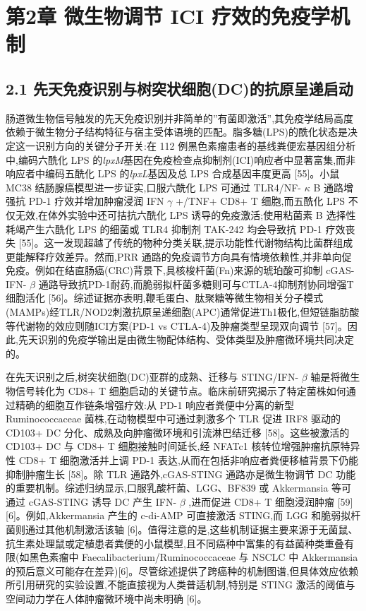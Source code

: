\documentclass[11pt]{article}
\begin{document}
\section{第2章 微生物调节 ICI 疗效的免疫学机制}\label{ux7b2c2ux7ae0-ux5faeux751fux7269ux8c03ux8282-ici-ux7597ux6548ux7684ux514dux75abux5b66ux673aux5236}

\subsection{2.1 先天免疫识别与树突状细胞(DC)的抗原呈递启动}\label{ux5148ux5929ux514dux75abux8bc6ux522bux4e0eux6811ux7a81ux72b6ux7ec6ux80dedcux7684ux6297ux539fux5448ux9012ux542fux52a8}

肠道微生物信号触发的先天免疫识别并非简单的''有菌即激活'',其免疫学结局高度依赖于微生物分子结构特征与宿主受体语境的匹配。脂多糖(LPS)的酰化状态是决定这一识别方向的关键分子开关:在 112 例黑色素瘤患者的基线粪便宏基因组分析中,编码六酰化 LPS 的\emph{lpxM}基因在免疫检查点抑制剂(ICI)响应者中显著富集,而非响应者中编码五酰化 LPS 的\emph{lpxL}基因及总 LPS 合成基因丰度更高 {[}55{]}。小鼠 MC38 结肠腺癌模型进一步证实,口服六酰化 LPS 可通过 TLR4/NF- \(\kappa\) B 通路增强抗 PD-1 疗效并增加肿瘤浸润 IFN \(\gamma\) +/TNF+ CD8+ T 细胞,而五酰化 LPS 不仅无效,在体外实验中还可拮抗六酰化 LPS 诱导的免疫激活;使用粘菌素 B 选择性耗竭产生六酰化 LPS 的细菌或 TLR4 抑制剂 TAK-242 均会导致抗 PD-1 疗效丧失 {[}55{]}。这一发现超越了传统的物种分类关联,提示功能性代谢物结构比菌群组成更能解释疗效差异。然而,PRR 通路的免疫调节方向具有情境依赖性,并非单向促免疫。例如在结直肠癌(CRC)背景下,具核梭杆菌(Fn)来源的琥珀酸可抑制 cGAS-IFN- \(\beta\) 通路导致抗PD-1耐药,而脆弱拟杆菌多糖则可与CTLA-4抑制剂协同增强T细胞活化 {[}56{]}。综述证据亦表明,鞭毛蛋白、肽聚糖等微生物相关分子模式(MAMPs)经TLR/NOD2刺激抗原呈递细胞(APC)通常促进Th1极化,但短链脂肪酸等代谢物的效应则随ICI方案(PD-1 vs CTLA-4)及肿瘤类型呈现双向调节 {[}57{]}。因此,先天识别的免疫学输出是由微生物配体结构、受体类型及肿瘤微环境共同决定的。

在先天识别之后,树突状细胞(DC)亚群的成熟、迁移与 STING/IFN- \(\beta\) 轴是将微生物信号转化为 CD8+ T 细胞启动的关键节点。临床前研究揭示了特定菌株如何通过精确的细胞互作链条增强疗效:从 PD-1 响应者粪便中分离的新型 Ruminococcaceae 菌株,在动物模型中可通过刺激多个 TLR 促进 IRF8 驱动的 CD103+ DC 分化、成熟及向肿瘤微环境和引流淋巴结迁移 {[}58{]}。这些被激活的 CD103+ DC 与 CD8+ T 细胞接触时间延长,经 NFATc1 核转位增强肿瘤抗原特异性 CD8+ T 细胞激活并上调 PD-1 表达,从而在包括非响应者粪便移植背景下仍能抑制肿瘤生长 {[}58{]}。除 TLR 通路外,cGAS-STING 通路亦是微生物调节 DC 功能的重要机制。综述归纳显示,口服乳酸杆菌、LGG、BF839 或 Akkermansia 等可通过 cGAS-STING 诱导 DC 产生 IFN- \(\beta\) ,进而促进 CD8+ T 细胞浸润肿瘤 {[}59{]}{[}6{]}。例如,Akkermansia 产生的 c-di-AMP 可直接激活 STING,而 LGG 和脆弱拟杆菌则通过其他机制激活该轴 {[}6{]}。值得注意的是,这些机制证据主要来源于无菌鼠、抗生素处理鼠或定植患者粪便的小鼠模型,且不同癌种中富集的有益菌种类重叠有限(如黑色素瘤中 Faecalibacterium/Ruminococcaceae 与 NSCLC 中 Akkermansia 的预后意义可能存在差异){[}6{]}。尽管综述提供了跨癌种的机制图谱,但具体效应依赖所引用研究的实验设置,不能直接视为人类普适机制,特别是 STING 激活的阈值与空间动力学在人体肿瘤微环境中尚未明确 {[}6{]}。
\end{document}
